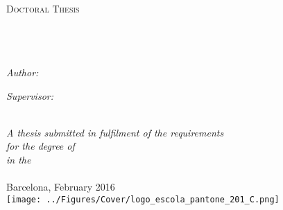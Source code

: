 \documentclass[
11pt, %
english, %
onehalfspacing %
]{MastersDoctoralThesis} %
\author{Oriol \textsc{Colomés Gené}} %
\begin{document}
\frontmatter %

\pagestyle{plain} %


\begin{titlepage}
\begin{center}

\textsc{\LARGE \univname}\\[1.5cm] %
\textsc{\Large Doctoral Thesis}\\[0.5cm] %

\HRule \\[0.4cm] %
{\huge \bfseries \ttitle}\\[0.4cm] %
\HRule \\[1.5cm] %
 
\begin{minipage}{0.4\textwidth}
\begin{flushleft} \large
\emph{Author:}\\
{\authorname} %
\end{flushleft}
\end{minipage}
\begin{minipage}{0.4\textwidth}
\begin{flushright} \large
\emph{Supervisor:} \\
{\supname} %
\end{flushright}
\end{minipage}\\[3cm]
 
\large \textit{A thesis submitted in fulfilment of the requirements\\ for the degree of \degreename}\\[0.3cm] %
\textit{in the}\\[0.4cm]
\deptname\\[2cm] %
 
{\large Barcelona, February 2016}\\[4cm] %
\texttt{[image: ../Figures/Cover/logo\_escola\_pantone\_201\_C.png]}
 
\vfill
\end{center}
\end{titlepage}
\end{document}
